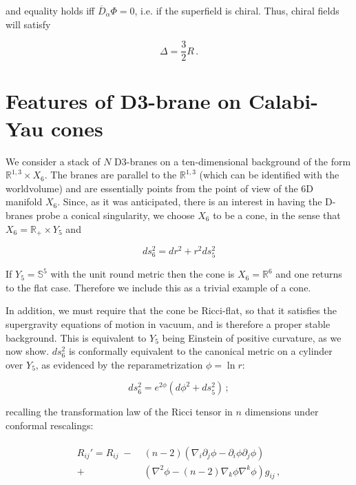 and equality holds iff $\overline D_{\dot\alpha} \Phi = 0$, i.e. if the superfield is chiral. Thus, chiral fields will satisfy

\begin{equation}
\Delta = \frac{3}{2} R\,. \label{deltarcharge}
\end{equation}


\section{Features of D3-brane on Calabi-Yau cones}\label{sec:generalcones}

We consider a stack of $N$ D3-branes on a ten-dimensional background of the form $\mathbb{R}^{1,3} \times X_6$. The branes are parallel to the $\mathbb{R}^{1,3}$ (which can be identified with the worldvolume) and are essentially points from the point of view of the 6D manifold $X_6$. Since, as it was anticipated, there is an interest in having the D-branes probe a conical singularity, we choose $X_6$ to be a cone, in the sense that $X_6 = \mathbb{R}_+ \times Y_5$ and

\begin{equation}
	ds_6^2 = dr^2 + r^2 ds_5^2
	\label{}
\end{equation}

If $Y_5 = \mathbb{S}^5$ with the unit round metric then the cone is $X_6 = \mathbb{R}^6$ and one returns to the flat case. Therefore we include this as a trivial example of a cone.

In addition, we must require that the cone be Ricci-flat, so that it satisfies the supergravity equations of motion in vacuum, and is therefore a proper stable background. This is equivalent to $Y_5$ being Einstein of positive curvature, as we now show. $ds_6^2$ is conformally equivalent to the canonical metric on a cylinder over $Y_5$, as evidenced by the reparametrization $\phi = \ln r$:

\begin{equation}
	ds_6^2 = e^{2\phi} \left( d\phi^2 + ds_5^2 \right)\,;
\end{equation}

recalling the transformation law of the Ricci tensor in $n$ dimensions under conformal rescalings:

\begin{align}
	\begin{split}
	R_{ij}' = R_{ij} \; - &\; (n-2)\left( \nabla_i \partial_j \phi - \partial_i \phi \partial_j \phi \right) \\+ &\; \left( \nabla^2 \phi - (n-2) \nabla_k \phi \nabla^k \phi \right) g_{ij}\,,
\end{split}
\end{align}

